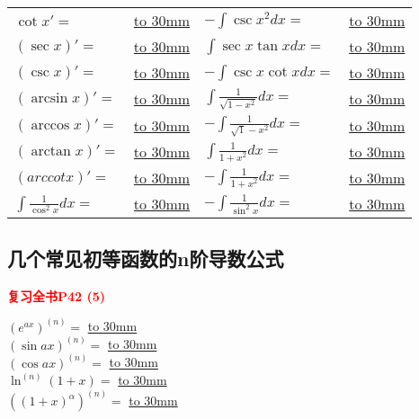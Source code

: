 \documentclass[a4paper]{ctexart}
\begin{document}
\begin{center}
\begin{tabular}{  l  l  l  l }
        ${\cot{x}}'=$                   &
        \underline{\hbox to 30mm{}}     & 
        $-\int{\csc{x}^2dx}=$           &
        \underline{\hbox to 30mm{}}     \\

        $(\sec{x})'=$                   &
        \underline{\hbox to 30mm{}}     & 
        $\int{\sec{x}\tan{x}dx}=$       &
        \underline{\hbox to 30mm{}}     \\

        $(\csc{x})'=$                   &
        \underline{\hbox to 30mm{}}     & 
        $-\int{\csc{x}\cot{x}dx}=$      &
        \underline{\hbox to 30mm{}}     \\

        $(\arcsin{x})'=$                &
        \underline{\hbox to 30mm{}}     & 
        $\int{\frac{1}{\sqrt{1-x^2}}dx}=$&
        \underline{\hbox to 30mm{}}     \\

        $(\arccos{x})'=$                &
        \underline{\hbox to 30mm{}}     & 
        $-\int{\frac{1}{\sqrt1-x^2}dx}=$&
        \underline{\hbox to 30mm{}}     \\

        $(\arctan{x})'=$                &
        \underline{\hbox to 30mm{}}     & 
        $\int{\frac{1}{1+x^2}dx}=$      &
        \underline{\hbox to 30mm{}}     \\

        $(arccotx)'=$                &
        \underline{\hbox to 30mm{}}     & 
        $-\int{\frac{1}{1+x^2}dx}=$     &
        \underline{\hbox to 30mm{}}     \\

        $\int{\frac{1}{\cos^2{x}}dx}=$  &
        \underline{\hbox to 30mm{}}     & 
        $-\int{\frac{1}{\sin^2{x}}dx}=$ &
        \underline{\hbox to 30mm{}}     \\

    \end{tabular}
\end{center}


\subsection{几个常见初等函数的n阶导数公式}
    \textcolor{red}{\textbf{复习全书P42 \quad (5)}}
\begin{multicols}{2}
    $(e^{ax})^{(n)}=$
        \underline{\hbox to 30mm{}}     \\
    $(\sin{ax})^{(n)}=$
        \underline{\hbox to 30mm{}}     \\
    $(\cos{ax})^{(n)}=$
        \underline{\hbox to 30mm{}}     \\
    $\ln^{(n)}{(1+x)}=$
        \underline{\hbox to 30mm{}}     \\
    $((1+x)^\alpha)^{(n)}=$
        \underline{\hbox to 30mm{}}     \\
\end{multicols}
\end{document}
